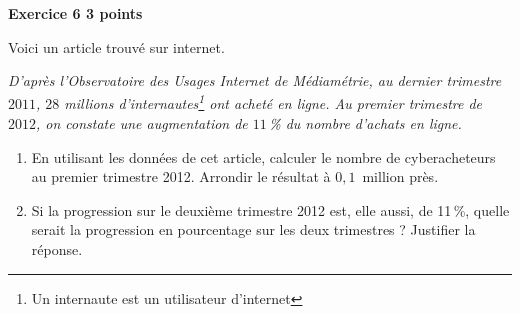 \textbf{Exercice 6 \hfill 3 points}

\medskip

Voici un article trouvé sur internet.
 
\emph{D'après l'Observatoire des Usages Internet de Médiamétrie, au dernier trimestre $2011$, $28$ millions d'internautes\footnote{Un internaute est un utilisateur d'internet}  ont acheté en ligne. Au premier trimestre de $2012$, on constate une augmentation de $11$\,\% du nombre d'achats en ligne.}

\medskip 

\begin{enumerate}
\item En utilisant les données de cet article, calculer le nombre de cyberacheteurs au premier trimestre 2012. Arrondir le résultat à $0,1$~million près. 
\item Si la progression sur le deuxième trimestre 2012 est, elle aussi, de 11\,\%, quelle serait la progression en pourcentage sur les deux trimestres ? Justifier la réponse.
\end{enumerate}
 
\bigskip

